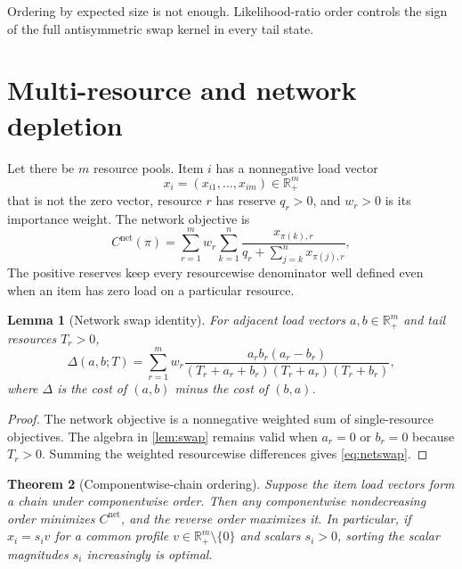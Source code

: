 \documentclass[pdflatex,iicol,sn-basic]{sn-jnl}
\theoremstyle{thmstyleone}
\newtheorem{theorem}{Theorem}[section]
\newtheorem{lemma}[theorem]{Lemma}
\theoremstyle{thmstyletwo}
\theoremstyle{thmstylethree}
\newcommand{\R}{\mathbb{R}}
\begin{document}
Ordering by expected size is not enough. Likelihood-ratio order controls the
sign of the full antisymmetric swap kernel in every tail state.

\section{Multi-resource and network depletion}
\label{sec:network}

Let there be \(m\) resource pools. Item \(i\) has a nonnegative load vector
\[
x_i=(x_{i1},\ldots,x_{im})\in\R_+^m
\]
that is not the zero vector, resource \(r\) has reserve \(q_r>0\), and
\(w_r>0\) is its importance weight. The network objective is
\begin{equation}\label{eq:networkobjective}
C^{\mathrm{net}}(\pi)
=
\sum_{r=1}^m w_r
\sum_{k=1}^{n}
\frac{x_{\pi(k),r}}
{q_r+\sum_{j=k}^n x_{\pi(j),r}},
\end{equation}
The positive reserves keep every resourcewise denominator well defined even
when an item has zero load on a particular resource.

\begin{lemma}[Network swap identity]
\label{lem:netswap}
For adjacent load vectors \(a,b\in\R_+^m\) and tail resources \(T_r>0\),
\begin{equation}\label{eq:netswap}
\Delta(a,b;T)
=
\sum_{r=1}^m
w_r
\frac{a_rb_r(a_r-b_r)}
{(T_r+a_r+b_r)(T_r+a_r)(T_r+b_r)},
\end{equation}
where \(\Delta\) is the cost of \((a,b)\) minus the cost of \((b,a)\).
\end{lemma}

\begin{proof}
The network objective is a nonnegative weighted sum of single-resource
objectives. The algebra in \cref{lem:swap} remains valid when \(a_r=0\) or
\(b_r=0\) because \(T_r>0\). Summing the weighted resourcewise differences
gives \eqref{eq:netswap}.
\end{proof}

\begin{theorem}[Componentwise-chain ordering]
\label{thm:chain}
Suppose the item load vectors form a chain under componentwise order. Then any
componentwise nondecreasing order minimizes \(C^{\mathrm{net}}\), and the reverse
order maximizes it. In particular, if \(x_i=s_i v\) for a common profile
\(v\in\R_+^m\setminus\{0\}\) and scalars \(s_i>0\), sorting the scalar magnitudes
\(s_i\) increasingly is optimal.
\end{theorem}
\end{document}
